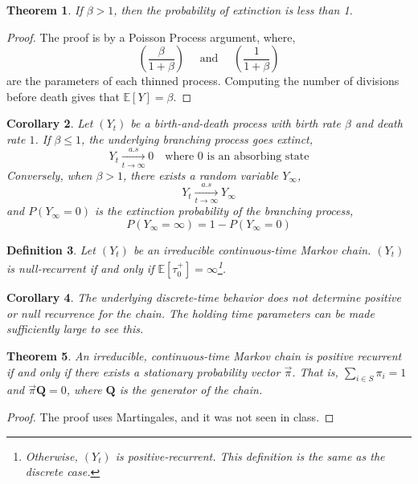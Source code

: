 \documentclass{tufte-handout}
\newtheorem{thm}{Theorem}
\newtheorem{cor}[thm]{Corollary}
\newtheorem{defn}[thm]{Definition}
\begin{document}
\begin{thm}
  If $\beta > 1$, then the probability of extinction is less than 1.
\end{thm}

\begin{proof}
  The proof is by a Poisson Process argument, where,
  \[\left(\frac{\beta}{1 + \beta}\right) \quad \text{ and } \quad \left(\frac{1}{1 + \beta}\right)\]
  \noindent are the parameters of each thinned process. Computing the number of divisions before death gives that $\mathbb{E}[Y] = \beta$.
\end{proof}

\begin{cor}
  Let $(Y_t)$ be a birth-and-death process with birth rate $\beta$ and death rate $1$. If $\beta \leq 1$, the underlying branching process goes extinct,
  \[Y_{t} \underset{t \rightarrow \infty}{\stackrel{a . s}{\longrightarrow}} 0 \quad \text{where $0$ is an absorbing state}\]
  \noindent Conversely, when $\beta > 1$, there exists a random variable $Y_{\infty}$,
  \[Y_{t} \underset{t \rightarrow \infty}{\stackrel{a . s}{\rightarrow}} Y_{\infty}\]
  \noindent and $P(Y_{\infty} = 0)$ is the extinction probability of the branching process,
  \[P(Y_{\infty} = \infty) = 1 - P(Y_{\infty} = 0)\]
\end{cor}

\begin{defn}
  Let $(Y_t)$ be an irreducible continuous-time Markov chain. $(Y_t)$ is null-recurrent if and only if $\mathbb{E}[\tau_0^+] = \infty$\footnote{Otherwise, $(Y_t)$ is positive-recurrent. This definition is the same as the discrete case.}.
\end{defn}

\begin{cor}
  The underlying discrete-time behavior does not determine positive or null recurrence for the chain. The holding time parameters can be made sufficiently large to see this.
\end{cor}

\begin{thm}
  An irreducible, continuous-time Markov chain is positive recurrent if and only if there exists a stationary probability vector $\Vec{\pi}$. That is, $\sum_{i \in S} \pi_i = 1$ and $\Vec{\pi} \mathbf{Q} = 0$, where $\mathbf{Q}$ is the generator of the chain.
\end{thm}

\begin{proof}
  The proof uses Martingales, and it was not seen in class.
\end{proof}
\end{document}
